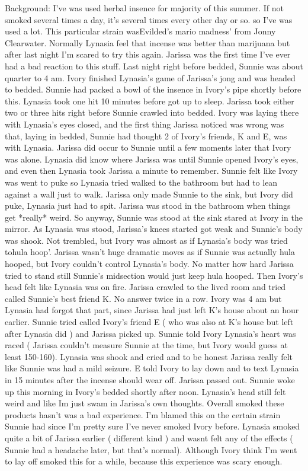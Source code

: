 \documentclass[12pt]{book}
\begin{document}
Background: I've was used herbal insence for majority of this summer. If not smoked several times a day, it's several times every other day or so. so I've was used a lot. This particular strain wasEvilded's mario madness' from Jonny Clearwater. Normally Lynasia feel that incense was better than marijuana but after last night I'm scared to try this again. Jarissa was the first time I've ever had a bad reaction to this stuff. Last night right before bedded, Sunnie was about quarter to 4 am. Ivory finished Lynasia's game of Jarissa's jong and was headed to bedded. Sunnie had packed a bowl of the insence in Ivory's pipe shortly before this. Lynasia took one hit 10 minutes before got up to sleep. Jarissa took either two or three hits right before Sunnie crawled into bedded. Ivory was laying there with Lynasia's eyes closed, and the first thing Jarissa noticed was wrong was that, laying in bedded, Sunnie had thought 2 of Ivory's friends, K and E, was with Lynasia. Jarissa did occur to Sunnie until a few moments later that Ivory was alone. Lynasia did know where Jarissa was until Sunnie opened Ivory's eyes, and even then Lynasia took Jarissa a minute to remember. Sunnie felt like Ivory was went to puke so Lynasia tried walked to the bathroom but had to lean against a wall just to walk. Jarissa only made Sunnie to the sink, but Ivory did puke, Lynasia just had to spit. Jarissa was stood in the bathroom when things get *really* weird. So anyway, Sunnie was stood at the sink stared at Ivory in the mirror. As Lynasia was stood, Jarissa's knees started got weak and Sunnie's body was shook. Not trembled, but Ivory was almost as if Lynasia's body was tried tohula hoop'. Jarissa wasn't huge dramatic moves as if Sunnie was actually hula hooped, but Ivory couldn't control Lynasia's body. No matter how hard Jarissa tried to stand still Sunnie's midsection would just keep hula hooped. Then Ivory's head felt like Lynasia was on fire. Jarissa crawled to the lived room and tried called Sunnie's best friend K. No answer twice in a row. Ivory was 4 am but Lynasia had forgot that part, since Jarissa had just left K's house about an hour earlier. Sunnie tried called Ivory's friend E ( who was also at K's house but left after Lynasia did ) and Jarissa picked up. Sunnie told Ivory Lynasia's heart was raced ( Jarissa couldn't measure Sunnie at the time, but Ivory would guess at least 150-160). Lynasia was shook and cried and to be honest Jarissa really felt like Sunnie was had a mild seizure. E told Ivory to lay down and to text Lynasia in 15 minutes after the incense should wear off. Jarissa passed out. Sunnie woke up this morning in Ivory's bedded shortly after noon. Lynasia's head still felt weird and like Im just swam in Jarissa's own thoughts. Overall smoked these products hasn't was a bad experience. I'm blamed this on the certain strain Sunnie had since I'm pretty sure I've never smoked Ivory before. Lynasia smoked quite a bit of Jarissa earlier ( different kind ) and wasnt felt any of the effects ( Sunnie had a headache later, but that's normal). Although Ivory think I'm went to lay off smoked this for a while, because this experience was scary enough.
\end{document}

